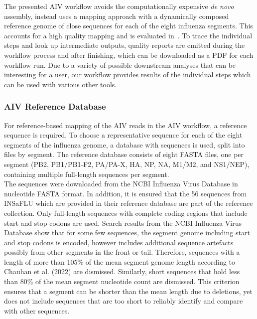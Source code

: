 The presented \ac{AIV} workflow avoids the computationally expensive \textit{de novo} assembly, instead uses a mapping approach with a dynamically composed reference genome of close sequences for each of the eight influenza segments. This accounts for a high quality mapping and is evaluated in~. To trace the individual steps and look up intermediate outputs, quality reports are emitted during the workflow process and after finishing, which can be downloaded as a PDF for each workflow run. Due to a variety of possible downstream analyses that can be interesting for a user, our workflow provides results of the individual steps which can be used with various other tools.

\subsubsection{AIV Reference Database}\label{sec:3-aiv-ref}
For reference-based mapping of the \ac{AIV} reads in the \ac{AIV} workflow, a reference sequence is required. To choose a representative sequence for each of the eight segments of the influenza genome, a database with sequences is used, split into files by segment. The reference database consists of eight FASTA files, one per segment (PB2, PB1/PB1-F2, PA/PA-X, HA, NP, NA, M1/M2, and NS1/NEP), containing multiple full-length sequences per segment.\\
The sequences were downloaded from the \ac{NCBI} Influenza Virus Database in nucleotide FASTA format. In addition, it is ensured that the 56 sequences from \ac{INSaFLU} which are provided in their reference database are part of the reference collection. Only full-length sequences with complete coding regions that include start and stop codons are used. Search results from the \ac{NCBI} Influenza Virus Database show that for some few sequences, the segment genome including start and stop codons is encoded, however includes additional sequence artefacts possibly from other segments in the front or tail. Therefore, sequences with a length of more than 105\% of the mean segment genome length according to Chauhan et al. (2022) are dismissed. Similarly, short sequences that hold less than 80\% of the mean segment nucleotide count are dismissed. This criterion ensures that a segment can be shorter than the mean length due to deletions, yet does not include sequences that are too short to reliably identify and compare with other sequences.\\
